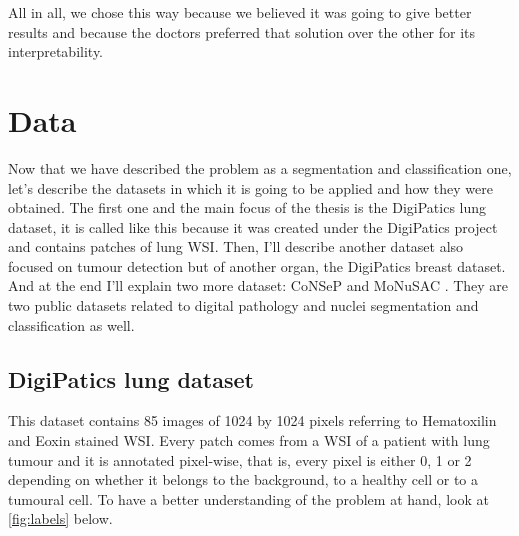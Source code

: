 All in all, we chose this way because we believed it was going to give better results and because the doctors preferred that solution over the other for its interpretability.

\section{Data}\label{sec:data}

Now that we have described the problem as a segmentation and classification one, let's describe the datasets in which it is going to be applied and how they were obtained. The first one and the main focus of the thesis is the DigiPatics lung dataset, it is called like this because it was created under the DigiPatics project \cite{DigiPatics2022} and contains patches of lung WSI. Then, I'll describe another dataset also focused on tumour detection but of another organ, the DigiPatics breast dataset. And at the end I'll explain two more dataset: CoNSeP \cite{hovernet} and MoNuSAC \cite{8880654}. They are two public datasets related to digital pathology and nuclei segmentation and classification as well. 

\subsection{DigiPatics lung dataset}\label{sec:data_lung}

This dataset contains 85 images of 1024 by 1024 pixels referring to Hematoxilin and Eoxin stained WSI. Every patch comes from a WSI of a patient with lung tumour and it is annotated pixel-wise, that is, every pixel is either 0, 1 or 2 depending on whether it belongs to the background, to a healthy cell or to a tumoural cell. To have a better understanding of the problem at hand, look at \autoref{fig:labels} below.


